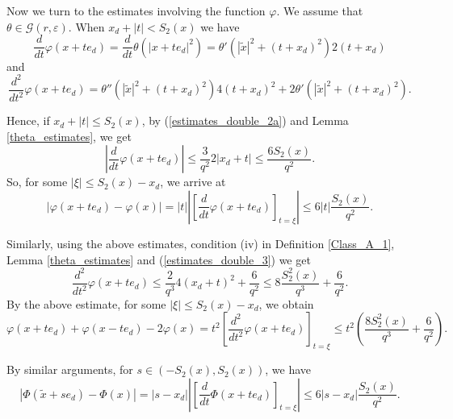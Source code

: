 \documentclass[a4paper,12pt,reqno]{amsart}
\theoremstyle{definition}
\theoremstyle{remark}
\newcommand{\eps}{\varepsilon}
\newcommand{\calG}{\mathcal{G}}
\begin{document}
Now we turn to the estimates  involving the function $\varphi$. We assume that $\theta \in \calG(r,\eps)$.
When $x_d+ |t |< S_2(x)$ we have
\begin{equation}
\label{estimates_double_2a}
\frac{d}{dt} \varphi(x + t e_d) = \frac{d}{dt} \theta(|x + t e_d|^2)
= \theta'(|\tilde{x}|^2 + (t + x_d)^2) 2 (t + x_d)
\end{equation}
and
\begin{equation}
\label{estimates_double_3}
\frac{d^2}{dt^2} \varphi(x + t e_d) = 
 \theta''(|\tilde{x}|^2 + (t + x_d)^2) 4 (t + x_d)^2 + 2 \theta'(|\tilde{x}|^2 + (t + x_d)^2).
\end{equation}

Hence, if $x_d + |t|\le S_2(x)$, by (\ref{estimates_double_2a}) and Lemma \ref{theta_estimates},  we get 
$$
\left| \frac{d}{dt} \varphi(x + t e_d) \right| 
\le \frac{3}{q^2} 2 |x_d + t| 
\le \frac{6 S_2(x)}{q^2}.
$$
So, for some  $|\xi| \le S_2(x)-x_d$, we arrive at
\begin{equation}
\left| \varphi(x + t e_d) - \varphi(x) \right| =
|t| \left| \left[\frac{d}{dt}\varphi(x + t e_d)\right]_{t = \xi} \right|
\le 6 |t|\frac{ S_2(x)}{q^2}\label{varphi}.
\end{equation}

Similarly,
using the above estimates, condition (iv) in Definition \ref{Class_A_1}, Lemma \ref{theta_estimates} and (\ref{estimates_double_3}) we get 
$$
\frac{d^2}{dt^2} \varphi(x + t e_d) \le \frac{2}{q^3} 4 (x_d + t)^2 + \frac{6}{q^2} 
\le  8 \frac{S_2^2(x)} {q^3} + \frac{6}{q^2}.$$
By the above estimate, for some $|\xi| \le S_2(x)-x_d$, we obtain
\begin{equation}
\label{estimates_double_4}
\varphi(x + t e_d) + \varphi(x - t e_d) - 2 \varphi(x) = t^2 \left[\frac{d^2}{dt^2}\varphi(x + t e_d)\right]_{t = \xi}
\le    t^2 \left(\frac{8 S_2^2(x)} {q^3} + \frac{6}{q^2}\right).
\end{equation}

 By similar arguments,   for $s \in (-S_2(x),S_2(x))$, we have %
\begin{equation}\label{diff1}
\left| \varPhi(\tilde{x} + s e_d) - \varPhi(x) \right| =
|s-x_d| \left| \left[\frac{d}{dt}\varPhi(x + t e_d)\right]_{t = \xi} \right|
\le 6 |s-x_d| \frac{S_2(x)}{q^{2} }.
\end{equation}
\end{document}
